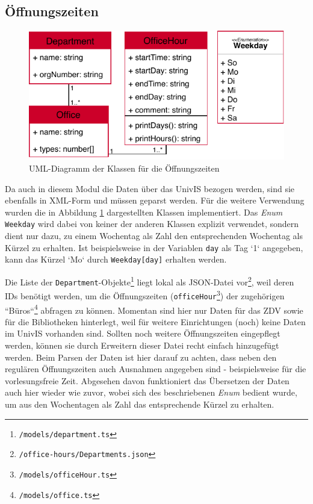 \subsection{Öffnungszeiten}
\label{sec:prog:officeHours}
\begin{figure}[h]
\centering
\includegraphics{gfx/Hours}
\caption{UML-Diagramm der Klassen für die Öffnungszeiten}
\label{fig:Hours}
\end{figure}
Da auch in diesem Modul die Daten über das UnivIS bezogen werden, sind sie ebenfalls in \acs{XML}-Form und müssen geparst werden. Für die weitere Verwendung wurden die in Abbildung \ref{fig:Hours} dargestellten Klassen implementiert. Das \textit{Enum} \texttt{Weekday} wird dabei von keiner der anderen Klassen explizit verwendet, sondern dient nur dazu, zu einem Wochentag als Zahl den entsprechenden Wochentag als Kürzel zu erhalten. Ist beispielsweise in der Variablen \texttt{day} als Tag `1` angegeben, kann das Kürzel `Mo` durch \texttt{Weekday[day]} erhalten werden.

Die Liste der \texttt{Department}-Objekte\footnote{\texttt{/models/department.ts}} liegt lokal als \acs{JSON}-Datei vor\footnote{\texttt{/office-hours/Departments.json}}, weil deren IDs benötigt werden, um die Öffnungszeiten (\texttt{officeHour}\footnote{\texttt{/models/officeHour.ts}}) der zugehörigen ``Büros``\footnote{\texttt{/models/office.ts}} abfragen zu können. Momentan sind hier nur Daten für das ZDV sowie für die Bibliotheken hinterlegt, weil für weitere Einrichtungen (noch) keine Daten im UnivIS vorhanden sind. Sollten noch weitere Öffnungszeiten eingepflegt werden, können sie durch Erweitern dieser Datei recht einfach hinzugefügt werden. Beim Parsen der Daten ist hier darauf zu achten, dass neben den regulären Öffnungszeiten auch Ausnahmen angegeben sind - beispielsweise für die vorlesungsfreie Zeit.
Abgesehen davon funktioniert das Übersetzen der Daten auch hier wieder wie zuvor, wobei sich des beschriebenen \textit{Enum} bedient wurde, um aus den Wochentagen als Zahl das entsprechende Kürzel zu erhalten.

